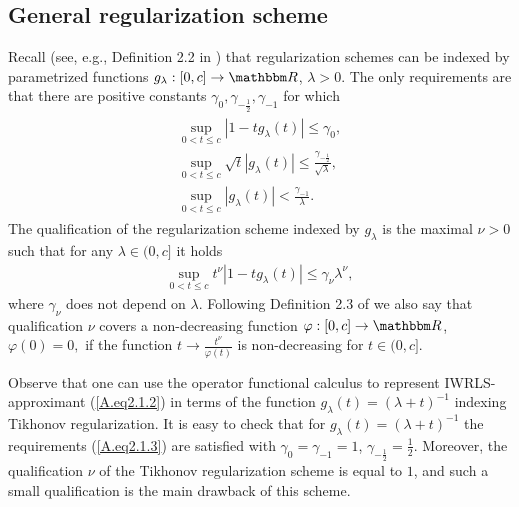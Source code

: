 \documentclass[USenglish]{article}
\def\R{\mathbbm R}
\begin{document}
\subsection{General regularization scheme}

Recall (see, e.g., Definition 2.2 in \cite{1stbook}) that regularization schemes can be indexed by parametrized functions $g_\lambda : [0,c] \rightarrow \R$,  $\lambda >0.$ The only requirements are that there are positive constants $\gamma_0, \gamma_{- \frac{1}{2}}, \gamma_{-1}$ for which 
\begin{align}\label{A.eq2.1.3}
\begin{split}
\sup_{0 < t \leq c} |1 - t g_\lambda (t)| \leq \gamma_0, \\
\sup_{0 < t \leq c} \sqrt{t} |g_\lambda (t)|\leq \frac{\gamma_{- \frac{1}{2}}}{ \sqrt{\lambda}}, \\
\sup_{0 < t \leq c}  |g_\lambda (t)| < \frac{\gamma_{-1}}{\lambda}.
\end{split}
\end{align}%
The qualification of the regularization scheme indexed by $g_\lambda$ is the maximal $\nu > 0 $ 
such that for any $\lambda \in (0,c]$ it holds
\begin{align}\label{eq2.1.4}
\sup_{0 < t \leq c} t^\nu | 1 - t g_\lambda (t)  | \leq \gamma_\nu \lambda^\nu, 
\end{align}
where $\gamma_\nu$ does not depend on $\lambda$. Following Definition 2.3 of \cite{1stbook} we also say that qualification $\nu$ covers a non-decreasing function $\varphi : [0,c ] \rightarrow \R$, $\varphi (0) = 0,$ if the function $t \rightarrow \frac{t^\nu}{\varphi (t)}$ is non-decreasing for $t \in (0,c].$ 

Observe that one can use the operator functional calculus to represent IWRLS-approximant (\ref{A.eq2.1.2}) in terms of the function $g_\lambda (t) = (\lambda + t)^{-1}$ indexing Tikhonov regularization. It is easy to check that for $g_\lambda (t) = (\lambda + t)^{-1}$ the requirements (\ref{A.eq2.1.3}) are satisfied with $\gamma_0 = \gamma_{-1} = 1$, $\gamma_{-\frac{1}{2}} = \frac{1}{2}$. Moreover, the qualification $\nu$ of the Tikhonov regularization scheme is equal to $1$, and such a small qualification is the main drawback of this scheme.
\end{document}
